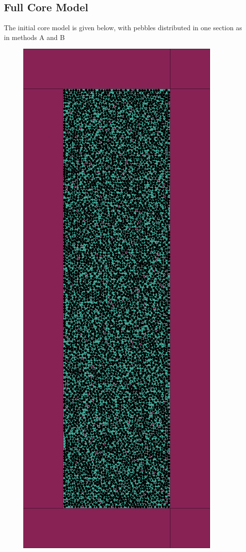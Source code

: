 \documentclass{anstrans}
\begin{document}

\subsection{Full Core Model}

The initial core model is given below, with pebbles distributed in one section as in methods A and B

\begin{figure}[H]
  \centering
  \includegraphics[width = \linewidth]{htgr-mr-full-core-axial}

\end{figure}
\end{document}
